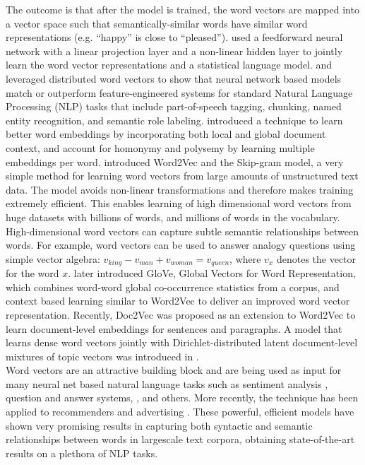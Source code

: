 \documentclass[twoside]{article}
\begin{document}
The outcome is that after the model is trained, the word vectors are mapped into a vector space such that semantically-similar words have similar word representations (e.g. “happy” is close to “pleased”). \cite{cite9} used a feedforward neural network with a linear projection layer and a non-linear hidden layer to jointly learn the word vector representations and a statistical language model. \cite{cite10} and \cite{cite11}  leveraged distributed word vectors to show that neural network based models match or outperform feature-engineered systems for standard Natural Language Processing (NLP) tasks that include part-of-speech tagging, chunking, named entity recognition, and semantic role labeling. \cite{cite14} introduced a technique to learn better word embeddings by incorporating both local and global document context, and account for homonymy and polysemy by learning multiple embeddings per word. \cite{cite15} \cite{cite16} \cite{cite17} introduced Word2Vec and the Skip-gram model, a very simple method for learning word vectors from large amounts of unstructured text data. The model avoids non-linear transformations and therefore makes training extremely efficient. This enables learning of high dimensional word vectors from huge datasets with billions of words, and millions of words in the vocabulary. \\High-dimensional word vectors can capture subtle semantic relationships between words. For example, word vectors can be used to answer analogy questions using simple vector algebra: $v_{king} - v_{man} + v_{woman} = v_{queen}$, where $v_x$ denotes the vector for the word $x$. \cite{cite18} later introduced GloVe, Global Vectors for Word Representation, which combines word-word global co-occurrence statistics from a corpus, and context based learning similar to Word2Vec to deliver an improved word vector representation.
Recently, Doc2Vec \cite{cite24} was proposed as an extension to Word2Vec to learn document-level embeddings for sentences and paragraphs. A model that learns dense word vectors jointly with Dirichlet-distributed latent document-level mixtures of topic vectors was introduced in \cite{cite25}.
\\ Word vectors are an attractive building block and are being used as input for many neural net based natural language tasks such as sentiment analysis \cite{cite19} \cite{cite20}, question and answer systems, \cite{cite21} \cite{cite22}, and others. More recently, the technique has been applied to recommenders and advertising \cite{cite23}. These powerful, efficient models have shown very promising results in capturing both syntactic and semantic relationships between words in largescale text corpora, obtaining state-of-the-art results on a plethora of NLP tasks.
\end{document}
